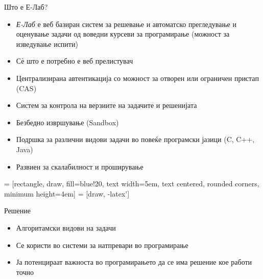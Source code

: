 \begin{frame}{Што е Е-Лаб?}
    \begin{itemize}[<+-| alert@+>]
      \item \emph{Е-Лаб} е веб базиран систем за решевање и автоматско прегледување
      и оценување задачи од воведни курсеви за програмирање (можност за
      изведување испити)
      \item Сѐ што е потребно е веб прелистувач
      \item Централизирана автентикација со можност за отворен или ограничен
      пристап (CAS)
      \item Систем за контрола на верзиите на задачите и решенијата
      \item Безбедно извршување (Sandbox)
      \item Подршка за различни видови задачи во повеќе програмски јазици (C, C++,
      Java)
      \item Развиен за скалабилност и проширување
    \end{itemize}
\end{frame}

 = [rectangle, draw, fill=blue!20,
text width=5em, text centered, rounded corners, minimum height=4em]
 = [draw, -latex']

\begin{frame}[fragile]{Решение}
	\begin{itemize}
  	  \item Алгоритамски видови на задачи
	\end{itemize}
\begin{center}
\end{center}
\pause
\begin{itemize}[<+->]
  \item Се користи во системи за натпревари во програмирање
  \item Ја потенцираат важноста во програмирањето да се има решение
  кое работи точно
\end{itemize}
\end{frame}


